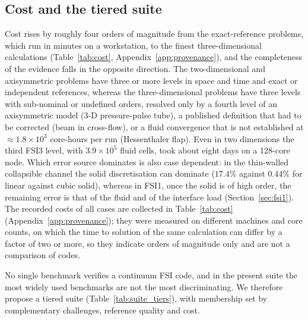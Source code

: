 \subsection{Cost and the tiered suite}\label{sec:cost}\label{sec:recommended_suite}

Cost rises by roughly four orders of magnitude from the exact-reference problems, which run in minutes on a workstation, to the finest three-dimensional calculations (Table~\ref{tab:cost}, Appendix~\ref{app:provenance}), and the completeness of the evidence falls in the opposite direction.
The two-dimensional and axisymmetric problems have three or more levels in space and time and exact or independent references, whereas the three-dimensional problems have three levels with sub-nominal or undefined orders, resolved only by a fourth level of an axisymmetric model (3-D pressure-pulse tube), a published definition that had to be corrected (beam in cross-flow), or a fluid convergence that is not established at $\approx1.8\times10^{3}$ core-hours per run (Hessenthaler flap).
Even in two dimensions the third FSI3 level, with $3.9\times10^5$ fluid cells, took about eight days on a 128-core node.
Which error source dominates is also case dependent: in the thin-walled collapsible channel the solid discretisation can dominate ($17.4\%$ against $0.44\%$ for linear against cubic solid), whereas in FSI1, once the solid is of high order, the remaining error is that of the fluid and of the interface load (Section~\ref{sec:fsi1}).
The recorded costs of all cases are collected in Table~\ref{tab:cost} (Appendix~\ref{app:provenance}); they were measured on different machines and core counts, on which the time to solution of the same calculation can differ by a factor of two or more, so they indicate orders of magnitude only and are not a comparison of codes.

No single benchmark verifies a continuum FSI code, and in the present suite the most widely used benchmarks are not the most discriminating.
We therefore propose a tiered suite (Table~\ref{tab:suite_tiers}), with membership set by complementary challenges, reference quality and cost.

